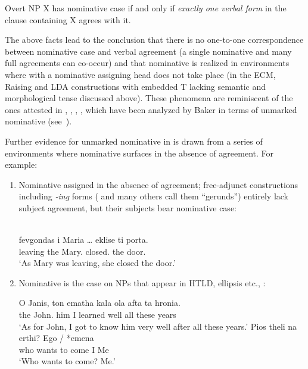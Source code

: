 \documentclass[output=paper]{langsci/langscibook}
\begin{document}
\begin{exe}
    \exi{\eqref{ex:13.1}}
    Overt NP X has nominative case if and only if \emph{exactly one verbal
    form} in the clause containing X agrees with it.
\z

The above facts lead to the conclusion that there is no one-to-one
correspondence between nominative case and verbal agreement
(a single nominative and many full agreements can co-occur) and that
nominative is realized in environments where 
with a nominative assigning head does not take place (in
the \gls{ECM}, Raising
and \gls{LDA} constructions with embedded T lacking semantic and morphological
tense discussed above). These phenomena are reminiscent of the ones attested in
, , , , which have been
analyzed by Baker in terms of unmarked nominative
(see~).

Further evidence for unmarked nominative in  is
drawn from a series of environments where nominative
surfaces in the absence of agreement. For example:

\begin{enumerate}
\item Nominative assigned in the absence of agreement;  free-adjunct
constructions including \emph{-ing} forms (\citealt{Tsimpli2000} and many
others call them \enquote{gerunds}) entirely lack subject agreement, but their
subjects bear nominative case:

\ea%
    \label{ex:13.30}\\
    \gll  fevgondas i Maria \dots{}     eklise ti porta.\\
            leaving the Mary.\Nom{} {}  closed.\Tsg{} the door.\Acc{}\\
    \glt  ‘As Mary was leaving, she closed the door.’
\z

\item Nominative is the case on NPs that appear in HTLD, ellipsis etc.,
\citet{Schutze2001}:

\ea%
    \label{ex:13.31}
	\ea
	\gll  O Janis, ton ematha kala ola afta ta hronia.\\
	    the John.\Nom{} him I learned well all these years\\
	\glt     ‘As for John, I got to know him very well after all these years.’
    \ex
	\gll  Pios theli na erthi?  Ego / *emena\\
            who wants to come  I {} \hphantom{*}Me\\
	\glt     ‘Who wants to come? Me.’
    \z
\z
\end{enumerate}


\end{exe}
\end{document}
